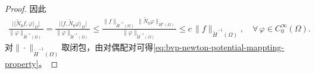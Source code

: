 \begin{proof}
因此
\begin{equation*}
  \begin{split}
    \frac{
    \big| \langle \widetilde{N}_{0}f, \varphi \rangle_{\Omega} \big|
    }{
    \| \varphi \|_{\widetilde{H}^{-1}(\Omega)}
    }
    =
    \frac{
    \big| \langle f, \widetilde{N}_{0} \varphi \rangle_{\Omega} \big|
    }{
    \| \varphi \|_{\widetilde{H}^{-1}(\Omega)}
    }
    \le \frac{
    \big\| f \big\|_{\widetilde{H}^{-1}(\Omega)} \, \big\| \widetilde{N}_{0} \varphi \big\|_{H^{1}(\Omega)}
    }{
    \| \varphi \|_{\widetilde{H}^{-1}(\Omega)}
    }
    \le c \, \big\| f \big\|_{\widetilde{H}^{-1}(\Omega)}, \quad \forall \, \varphi \in C_{0}^{\infty}(\Omega).
  \end{split}
\end{equation*}
对$\| \cdot \|_{\widetilde{H}^{-1}(\Omega)}$取闭包，由对偶配对可得\eqref{eq:bvp-newton-potential-mappting-property}。
\end{proof}


